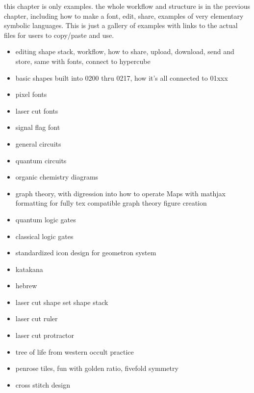 this chapter is only examples. the whole workflow and structure is in the previous chapter, including how to make a font, edit, share, examples of very elementary symbolic languages.  This is just a gallery of examples with links to the actual files for users to copy/paste and use.

\begin{itemize}
\tightlist
\item
editing shape stack, workflow, how to share, upload, download, send and store, same with fonts, connect to hypercube
\item
basic shapes built into 0200 thru 0217, how it's all connected to 01xxx
\item
pixel fonts
\item
laser cut fonts
\item
signal flag font
\item
general circuits
\item
quantum circuits
\item
organic chemistry diagrams
\item
graph theory, with digression into how to operate Maps with mathjax formatting for fully tex compatible graph theory figure creation
\item
quantum logic gates
\item 
classical logic gates
\item
standardized icon design for geometron system
\item
katakana
\item
hebrew
\item
laser cut shape set shape stack
\item
laser cut ruler
\item
laser cut protractor
\item
tree of life from western occult practice
\item
penrose tiles, fun with golden ratio, fivefold symmetry
\item
cross stitch design
\end{itemize}